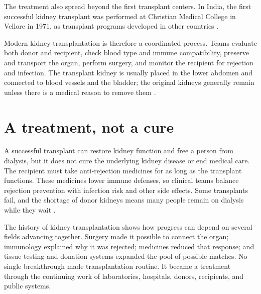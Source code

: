 \documentclass[12pt,oneside]{book}
\begin{document}
The treatment also spread beyond the first transplant centers. In India, the
first successful kidney transplant was performed at Christian Medical College
in Vellore in 1971, as transplant programs developed in other countries
\cite{kidneyTransplantReview}.

Modern kidney transplantation is therefore a coordinated process. Teams
evaluate both donor and recipient, check blood type and immune compatibility,
preserve and transport the organ, perform surgery, and monitor the recipient
for rejection and infection. The transplant kidney is usually placed in the
lower abdomen and connected to blood vessels and the bladder; the original
kidneys generally remain unless there is a medical reason to remove them
\cite{niddkKidneyTransplant}.

\section{A treatment, not a cure}
A successful transplant can restore kidney function and free a person from
dialysis, but it does not cure the underlying kidney disease or end medical
care. The recipient must take anti-rejection medicines for as long as the
transplant functions. These medicines lower immune defenses, so clinical
teams balance rejection prevention with infection risk and other side effects.
Some transplants fail, and the shortage of donor kidneys means many people
remain on dialysis while they wait \cite{niddkKidneyTransplant}.

The history of kidney transplantation shows how progress can depend on
several fields advancing together. Surgery made it possible to connect the
organ; immunology explained why it was rejected; medicines reduced that
response; and tissue testing and donation systems expanded the pool of
possible matches. No single breakthrough made transplantation routine. It
became a treatment through the continuing work of laboratories, hospitals,
donors, recipients, and public systems.
\end{document}
